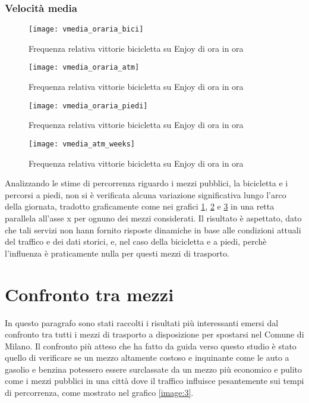 \subsubsection{Velocità media}

\begin{figure}[H]
	\texttt{[image: vmedia\_oraria\_bici]}
	\caption{Frequenza relativa vittorie bicicletta su Enjoy di ora in ora}
	\label{image:11}
\end{figure}

\begin{figure}[H]
	\texttt{[image: vmedia\_oraria\_atm]}
	\caption{Frequenza relativa vittorie bicicletta su Enjoy di ora in ora}
	\label{image:17}
\end{figure}

\begin{figure}[H]
	\texttt{[image: vmedia\_oraria\_piedi]}
	\caption{Frequenza relativa vittorie bicicletta su Enjoy di ora in ora}
	\label{image:18}
\end{figure}

\begin{figure}[H]
	\texttt{[image: vmedia\_atm\_weeks]}
	\caption{Frequenza relativa vittorie bicicletta su Enjoy di ora in ora}
	\label{image:29}
\end{figure}

Analizzando le stime di percorrenza riguardo i mezzi pubblici, la bicicletta e i percorsi a piedi, non si è verificata alcuna variazione significativa lungo l'arco della giornata, tradotto graficamente come nei grafici \ref{image:11}, \ref{image:17} e \ref{image:18} in una retta parallela all'asse x per ognuno dei mezzi considerati. Il risultato è aspettato, dato che tali servizi non hann fornito risposte dinamiche in base alle condizioni attuali del traffico e dei dati storici, e, nel caso della bicicletta e a piedi, perchè l'influenza è praticamente nulla per questi mezzi di trasporto.

\section{Confronto tra mezzi}

In questo paragrafo sono stati raccolti i risultati più interessanti emersi dal confronto tra tutti i mezzi di trasporto a disposizione per spostarsi nel Comune di Milano. Il confronto più atteso che ha fatto da guida verso questo studio è stato quello di verificare se un mezzo altamente costoso e inquinante come le auto a gasolio e benzina potessero essere surclassate da un mezzo più economico e pulito come i mezzi pubblici in una città dove il traffico influisce pesantemente sui tempi di percorrenza, come mostrato nel grafico \ref{image:3}.

